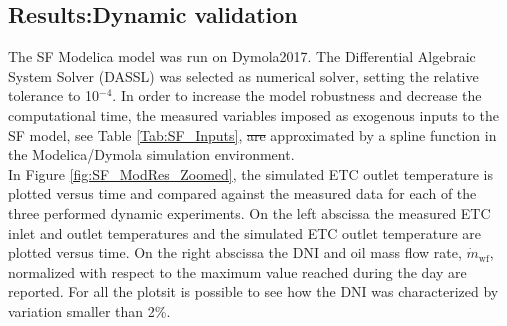 \documentclass[final,3p,times,review]{elsarticle}
\providecommand{\DIFadd}[1]{{\protect\color{blue}\uwave{#1}}} %
\providecommand{\DIFdel}[1]{{\protect\color{red}\sout{#1}}}                      %
\providecommand{\DIFaddbegin}{} %
\providecommand{\DIFaddend}{} %
\providecommand{\DIFdelbegin}{} %
\providecommand{\DIFdelend}{} %
\begin{document}
\subsection{Results:Dynamic validation}  \label{Sec:DynamicValidation}
%
The SF Modelica model was run on Dymola2017. The Differential Algebraic System Solver (DASSL) \cite{Petzold1983} was selected as numerical solver, setting the relative tolerance to 10$^{-4}$. In order to increase the model robustness and decrease the computational time, the measured variables imposed as exogenous inputs to the SF model, see Table \ref{Tab:SF_Inputs}, \DIFdelbegin \DIFdel{are }\DIFdelend \DIFaddbegin \DIFadd{were }\DIFaddend approximated by a spline function in the Modelica/Dymola simulation environment.\\
In Figure \ref{fig:SF_ModRes_Zoomed}, the simulated ETC outlet temperature is plotted versus time and compared against the measured data for each of the three performed dynamic experiments. On the left abscissa the measured ETC inlet and outlet temperatures and the simulated ETC outlet temperature are plotted versus time. On the right abscissa the DNI and oil mass flow rate, $\dot{m}_\mathrm{wf}$, normalized with respect to the maximum value reached during the day \DIFaddbegin \DIFadd{(DNI$_\mathrm{max}$, $\dot{m}_\mathrm{wf,max}$), }\DIFaddend are reported.  For all the plots\DIFaddbegin \DIFadd{, }\DIFaddend it is possible to see how the DNI was characterized by variation smaller than 2\%. \\
\end{document}

